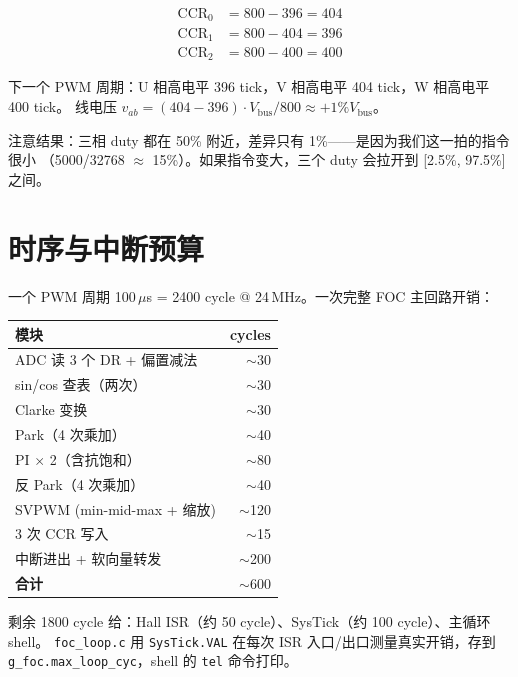 \documentclass[UTF8,a4paper,11pt]{ctexart}
\newcommand{\reg}[1]{\texttt{#1}}
\newcommand{\code}[1]{\texttt{#1}}
\begin{document}
\begin{align*}
\text{CCR}_0 &= 800 - 396 = 404 \\
\text{CCR}_1 &= 800 - 404 = 396 \\
\text{CCR}_2 &= 800 - 400 = 400
\end{align*}

下一个 PWM 周期：U 相高电平 396 tick，V 相高电平 404 tick，W 相高电平 400 tick。
线电压 $v_{ab} = (404-396) \cdot V_\text{bus}/800 \approx +1\% V_\text{bus}$。

\begin{intuition}
注意结果：三相 duty 都在 50\% 附近，差异只有 1\%——是因为我们这一拍的指令很小
（5000/32768 $\approx$ 15\%）。如果指令变大，三个 duty 会拉开到 [2.5\%, 97.5\%] 之间。
\end{intuition}

\section{时序与中断预算}

一个 PWM 周期 100\,$\mu$s = 2400 cycle @ 24\,MHz。一次完整 FOC 主回路开销：

\begin{table}[h]
\centering
\begin{tabular}{lr}
\toprule
模块 & cycles \\
\midrule
ADC 读 3 个 DR + 偏置减法     & $\sim$30 \\
sin/cos 查表（两次）          & $\sim$30 \\
Clarke 变换                   & $\sim$30 \\
Park（4 次乘加）              & $\sim$40 \\
PI $\times$ 2（含抗饱和）     & $\sim$80 \\
反 Park（4 次乘加）           & $\sim$40 \\
SVPWM (min-mid-max + 缩放)    & $\sim$120 \\
3 次 CCR 写入                 & $\sim$15 \\
中断进出 + 软向量转发         & $\sim$200 \\
\midrule
\textbf{合计}                 & $\sim$600 \\
\bottomrule
\end{tabular}
\end{table}

剩余 1800 cycle 给：Hall ISR（约 50 cycle）、SysTick（约 100 cycle）、主循环 shell。
\code{foc\_loop.c} 用 \reg{SysTick.VAL} 在每次 ISR 入口/出口测量真实开销，存到
\code{g\_foc.max\_loop\_cyc}，shell 的 \code{tel} 命令打印。
\end{document}
